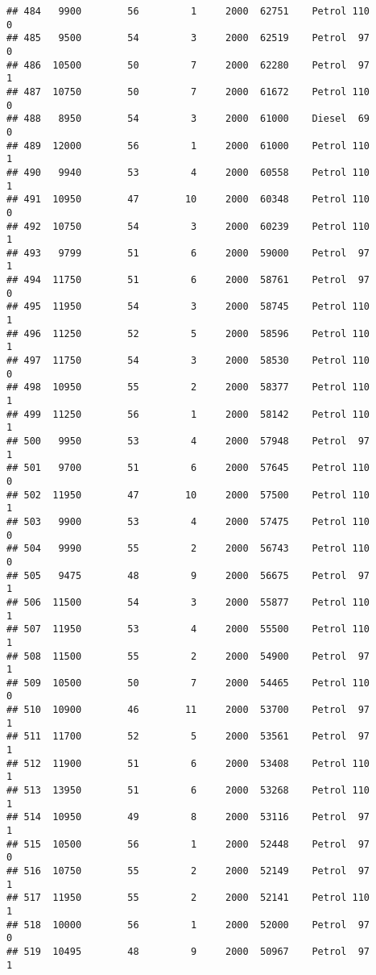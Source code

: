 \documentclass[]{article}
\begin{document}
\begin{verbatim}
## 484   9900        56         1     2000  62751    Petrol 110         0
## 485   9500        54         3     2000  62519    Petrol  97         0
## 486  10500        50         7     2000  62280    Petrol  97         1
## 487  10750        50         7     2000  61672    Petrol 110         0
## 488   8950        54         3     2000  61000    Diesel  69         0
## 489  12000        56         1     2000  61000    Petrol 110         1
## 490   9940        53         4     2000  60558    Petrol 110         1
## 491  10950        47        10     2000  60348    Petrol 110         0
## 492  10750        54         3     2000  60239    Petrol 110         1
## 493   9799        51         6     2000  59000    Petrol  97         1
## 494  11750        51         6     2000  58761    Petrol  97         0
## 495  11950        54         3     2000  58745    Petrol 110         1
## 496  11250        52         5     2000  58596    Petrol 110         1
## 497  11750        54         3     2000  58530    Petrol 110         0
## 498  10950        55         2     2000  58377    Petrol 110         1
## 499  11250        56         1     2000  58142    Petrol 110         1
## 500   9950        53         4     2000  57948    Petrol  97         1
## 501   9700        51         6     2000  57645    Petrol 110         0
## 502  11950        47        10     2000  57500    Petrol 110         1
## 503   9900        53         4     2000  57475    Petrol 110         0
## 504   9990        55         2     2000  56743    Petrol 110         0
## 505   9475        48         9     2000  56675    Petrol  97         1
## 506  11500        54         3     2000  55877    Petrol 110         1
## 507  11950        53         4     2000  55500    Petrol 110         1
## 508  11500        55         2     2000  54900    Petrol  97         1
## 509  10500        50         7     2000  54465    Petrol 110         0
## 510  10900        46        11     2000  53700    Petrol  97         1
## 511  11700        52         5     2000  53561    Petrol  97         1
## 512  11900        51         6     2000  53408    Petrol 110         1
## 513  13950        51         6     2000  53268    Petrol 110         1
## 514  10950        49         8     2000  53116    Petrol  97         1
## 515  10500        56         1     2000  52448    Petrol  97         0
## 516  10750        55         2     2000  52149    Petrol  97         1
## 517  11950        55         2     2000  52141    Petrol 110         1
## 518  10000        56         1     2000  52000    Petrol  97         0
## 519  10495        48         9     2000  50967    Petrol  97         1

\end{verbatim}
\end{document}
